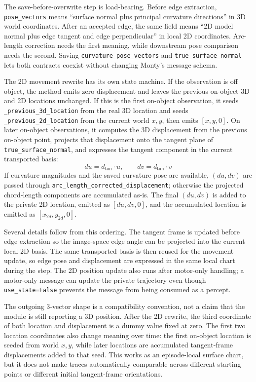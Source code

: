 \documentclass{article}
\begin{document}
The save-before-overwrite step is load-bearing.
Before edge extraction, \texttt{pose\_vectors} means ``surface normal plus principal curvature directions'' in 3D world coordinates.
After an accepted edge, the same field means ``2D model normal plus edge tangent and edge perpendicular'' in local 2D coordinates.
Arc-length correction needs the first meaning, while downstream pose comparison needs the second.
Saving \texttt{curvature\_pose\_vectors} and \texttt{true\_surface\_normal} lets both contracts coexist without changing Monty's message schema.

The 2D movement rewrite has its own state machine.
If the observation is off object, the method emits zero displacement and leaves the previous on-object 3D and 2D locations unchanged.
If this is the first on-object observation, it seeds \texttt{\_previous\_3d\_location} from the real 3D location and seeds \texttt{\_previous\_2d\_location} from the current world \(x, y\), then emits \([x, y, 0]\).
On later on-object observations, it computes the 3D displacement from the previous on-object point, projects that displacement onto the tangent plane of \texttt{true\_surface\_normal}, and expresses the tangent component in the current transported basis:
\[
  du = d_{\mathrm{tan}} \cdot u,
  \qquad
  dv = d_{\mathrm{tan}} \cdot v
\]
If curvature magnitudes and the saved curvature pose are available, \((du, dv)\) are passed through \texttt{arc\_length\_corrected\_displacement}; otherwise the projected chord-length components are accumulated as-is.
The final \((du, dv)\) is added to the private 2D location, emitted as \([du, dv, 0]\), and the accumulated location is emitted as \([x_{2d}, y_{2d}, 0]\).

Several details follow from this ordering.
The tangent frame is updated before edge extraction so the image-space edge angle can be projected into the current local 2D basis.
The same transported basis is then reused for the movement update, so edge pose and displacement are expressed in the same local chart during the step.
The 2D position update also runs after motor-only handling; a motor-only message can update the private trajectory even though \texttt{use\_state=False} prevents the message from being consumed as a percept.

The outgoing 3-vector shape is a compatibility convention, not a claim that the module is still reporting a 3D position.
After the 2D rewrite, the third coordinate of both location and displacement is a dummy value fixed at zero.
The first two location coordinates also change meaning over time: the first on-object location is seeded from world \(x, y\), while later locations are accumulated tangent-frame displacements added to that seed.
This works as an episode-local surface chart, but it does not make traces automatically comparable across different starting points or different initial tangent-frame orientations.
\end{document}
